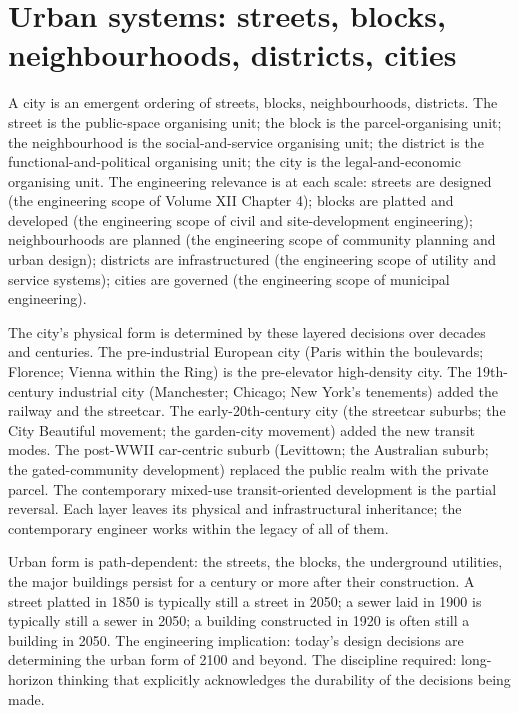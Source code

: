 \section{Urban systems: streets, blocks, neighbourhoods, districts, cities}

A city is an emergent ordering of streets, blocks, neighbourhoods, districts. The street is the public-space organising unit; the block is the parcel-organising unit; the neighbourhood is the social-and-service organising unit; the district is the functional-and-political organising unit; the city is the legal-and-economic organising unit. The engineering relevance is at each scale: streets are designed (the engineering scope of Volume XII Chapter 4); blocks are platted and developed (the engineering scope of civil and site-development engineering); neighbourhoods are planned (the engineering scope of community planning and urban design); districts are infrastructured (the engineering scope of utility and service systems); cities are governed (the engineering scope of municipal engineering).

The city's physical form is determined by these layered decisions over decades and centuries. The pre-industrial European city (Paris within the boulevards; Florence; Vienna within the Ring) is the pre-elevator high-density city. The 19th-century industrial city (Manchester; Chicago; New York's tenements) added the railway and the streetcar. The early-20th-century city (the streetcar suburbs; the City Beautiful movement; the garden-city movement) added the new transit modes. The post-WWII car-centric suburb (Levittown; the Australian suburb; the gated-community development) replaced the public realm with the private parcel. The contemporary mixed-use transit-oriented development is the partial reversal. Each layer leaves its physical and infrastructural inheritance; the contemporary engineer works within the legacy of all of them.

\begin{principle}
Urban form is path-dependent: the streets, the blocks, the underground utilities, the major buildings persist for a century or more after their construction. A street platted in 1850 is typically still a street in 2050; a sewer laid in 1900 is typically still a sewer in 2050; a building constructed in 1920 is often still a building in 2050. The engineering implication: today's design decisions are determining the urban form of 2100 and beyond. The discipline required: long-horizon thinking that explicitly acknowledges the durability of the decisions being made.
\end{principle}

